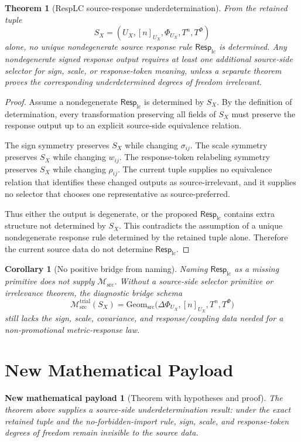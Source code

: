 \documentclass[11pt]{article}
\newcommand{\Msrc}{\mathcal{M}_{\mathrm{src}}}
\newcommand{\Mtrial}{\mathcal{M}^{\mathrm{trial}}_{\mathrm{src}}}
\newcommand{\RespLC}{\mathsf{Resp}_{\mathrm{lc}}}
\newtheorem{theorem}{Theorem}
\newtheorem{corollary}{Corollary}
\newtheorem{payload}{New mathematical payload}
\begin{document}
\begin{theorem}[RespLC source-response underdetermination]
From the retained tuple
\[
    S_X=(U_X,[n]_{U_X},\Phi_{U_X},T^n,T^\Phi)
\]
alone, no unique nondegenerate source response rule \(\RespLC\) is
determined. Any nondegenerate signed response output requires at least
one additional source-side selector for sign, scale, or response-token
meaning, unless a separate theorem proves the corresponding
underdetermined degrees of freedom irrelevant.
\end{theorem}

\begin{proof}
Assume a nondegenerate \(\RespLC\) is determined by \(S_X\). By the
definition of determination, every transformation preserving all
fields of \(S_X\) must preserve the response output up to an explicit
source-side equivalence relation.

The sign symmetry preserves \(S_X\) while changing \(\sigma_{ij}\).
The scale symmetry preserves \(S_X\) while changing \(w_{ij}\). The
response-token relabeling symmetry preserves \(S_X\) while changing
\(\rho_{ij}\). The current tuple supplies no equivalence relation that
identifies these changed outputs as source-irrelevant, and it supplies
no selector that chooses one representative as source-preferred.

Thus either the output is degenerate, or the proposed \(\RespLC\)
contains extra structure not determined by \(S_X\). This contradicts
the assumption of a unique nondegenerate response rule determined by
the retained tuple alone. Therefore the current source data do not
determine \(\RespLC\).
\end{proof}

\begin{corollary}[No positive bridge from naming]
Naming \(\RespLC\) as a missing primitive does not supply \(\Msrc\).
Without a source-side selector primitive or irrelevance theorem, the
diagnostic bridge schema
\[
    \Mtrial(S_X)
    =
    \mathrm{Geom}_{\mathrm{src}}
    \bigl(\Delta\Phi_{U_X},[n]_{U_X},T^n,T^\Phi\bigr)
\]
still lacks the sign, scale, covariance, and response/coupling data
needed for a non-promotional metric-response law.
\end{corollary}

\section{New Mathematical Payload}

\begin{payload}[Theorem with hypotheses and proof]
The theorem above supplies a source-side underdetermination result:
under the exact retained tuple and the no-forbidden-import rule, sign,
scale, and response-token degrees of freedom remain invisible to the
source data.
\end{payload}
\end{document}

